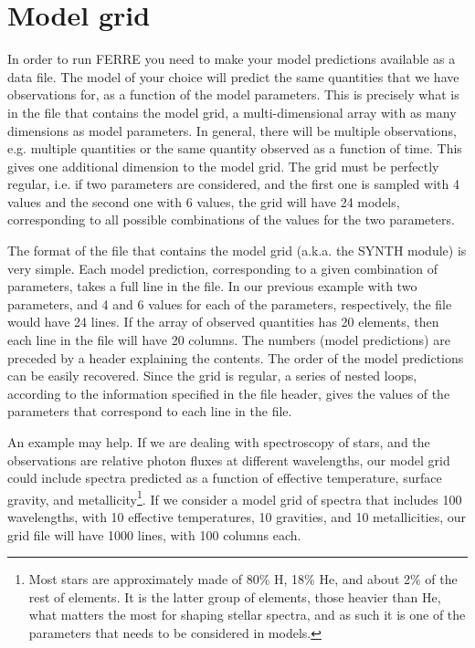 \documentclass[12pt]{article}
\begin{document}
\section{Model grid}
\label{grid}

In order to run FERRE you need to make your model predictions available 
as a data file. 
The model of your choice will predict
the same quantities that we have observations
for, as a function of the model parameters. This is precisely what
is in the file that contains the model grid, 
a multi-dimensional array
with as many dimensions as model parameters. In general, there will 
be multiple observations, e.g. multiple quantities or the same quantity
observed as a function of time. This gives one additional dimension
to the model grid. The grid must be perfectly regular, 
i.e. if two parameters are considered, and the first one is sampled
with 4 values  and  the second one with 6 values, the grid will 
have 24 models, corresponding to all possible combinations of
the values for the two parameters.    

The format of the file that contains the model grid (a.k.a. the SYNTH
module) is very simple. Each model prediction, corresponding to a given
combination of parameters, takes a full line in the file. In our previous
example with two parameters, and 4 and 6 values for each of the parameters,
respectively, the file would have 24 lines. If the array of observed
quantities has 20 elements, then each line in the file will have 20 
columns. The numbers (model predictions) are preceded by
a header explaining the contents.   The order of the model predictions
can be easily recovered. Since the grid is regular, a series of
nested loops, according to the information  specified in the file header, 
gives  the values of the parameters that correspond to each line 
in the file.    

An example may help. If we are dealing with spectroscopy of stars,
and the observations are relative photon fluxes at different wavelengths,
our model grid could include spectra predicted as a function of 
effective temperature, surface gravity, and 
metallicity\footnote{Most stars are approximately made of 80\%  H, 18\% He, 
and about 2\% of the rest of elements. It is the latter group of elements, 
those heavier than He, what matters the most for shaping stellar spectra, 
and as such it is one of the parameters that needs to be considered in 
models.}.
If we consider a model grid of spectra that includes 100 wavelengths, 
with 10 effective temperatures, 10 gravities,
and 10 metallicities, our grid file will have 1000 lines, with 100 columns each.
\end{document}
